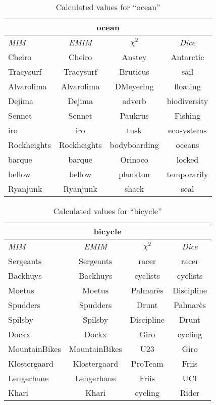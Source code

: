 \begin{table}[h!]
\centering
\begin{tabular}{ l | c | c | c }
\hline
\multicolumn{4}{c}{ocean}\\
\hline
\textit{MIM} & \textit{EMIM} & \textit{\(\chi^2\)} & \textit{Dice}\\
\hline
Cheiro & Cheiro & Anstey & Antarctic\\
Tracysurf & Tracysurf & Bruticus & sail\\
Alvarolima & Alvarolima & DMeyering & floating\\
Dejima & Dejima & adverb & biodiversity\\
Sennet & Sennet & Paukrus & Fishing\\
iro & iro & tusk & ecosystems\\
Rockheights & Rockheights & bodyboarding & oceans\\
barque & barque & Orinoco & locked\\
bellow & bellow & plankton & temporarily\\
Ryanjunk & Ryanjunk & shack & seal\\
\hline
\end{tabular}
\caption{Calculated values for ``ocean''}
\label{tab:words}
\end{table}
\begin{table}[h!]
\centering
\begin{tabular}{ l | c | c | c }
\hline
\multicolumn{4}{c}{bicycle}\\
\hline
\textit{MIM} & \textit{EMIM} & \textit{\(\chi^2\)} & \textit{Dice}\\
\hline
Sergeants & Sergeants & racer & racer\\
Backhuys & Backhuys & cyclists & cyclists\\
Moetus & Moetus & Palmarès & Discipline\\
Spudders & Spudders & Drunt & Palmarès\\
Spilsby & Spilsby & Discipline & Drunt\\
Dockx & Dockx & Giro & cycling\\
MountainBikes & MountainBikes & U23 & Giro\\
Klostergaard & Klostergaard & ProTeam & Friis\\
Lengerhane & Lengerhane & Friis & UCI\\
Khari & Khari & cycling & Rider\\
\hline
\end{tabular}
\caption{Calculated values for ``bicycle''}
\label{tab:words}
\end{table}
